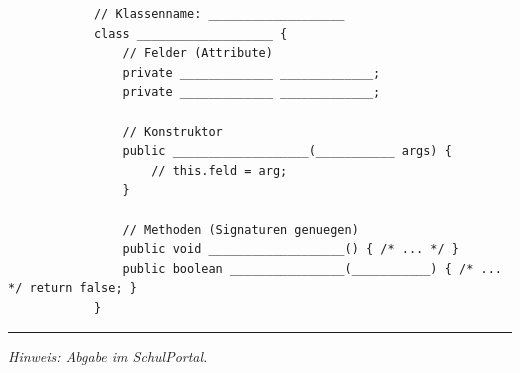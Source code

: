 \documentclass[11pt,a4paper]{scrartcl}
\newenvironment{aufgaben}{%
	\begin{enumerate}[leftmargin=*,label=\textbf{Aufgabe~\arabic*:}]
	}{\end{enumerate}}
\begin{document}
\begin{aufgaben}
		\begin{lstlisting}
			// Klassenname: ___________________
			class ___________________ {
				// Felder (Attribute)
				private _____________ _____________;
				private _____________ _____________;
				
				// Konstruktor
				public ___________________(___________ args) {
					// this.feld = arg;
				}
				
				// Methoden (Signaturen genuegen)
				public void ___________________() { /* ... */ }
				public boolean ________________(___________) { /* ... */ return false; }
			}
		\end{lstlisting}
		
		\vspace{0.2cm}
				
			\end{aufgaben}
			
			\vfill
			\hrule
			\small\emph{Hinweis: Abgabe im SchulPortal.}
			
		
\end{document}
